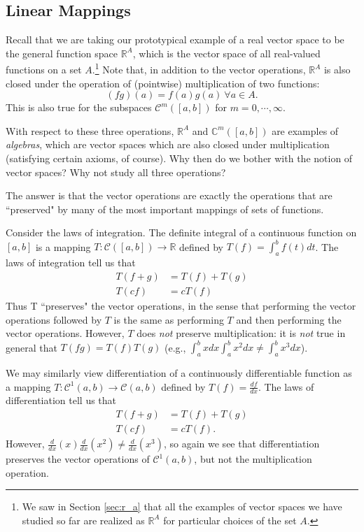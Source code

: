 \documentclass[12pt,letterpaper,reqno]{article}
\numberwithin{equation}{section}
\begin{document}
\subsection{Linear Mappings}
Recall that we are taking our prototypical example of a real vector space to be the general function space $\mathbb{R}^A$, which is the vector space of all real-valued functions on a set $A$.\footnote{We saw in Section \ref{sec:r_a} that all the examples of vector spaces we have studied so far are realized as $\mathbb{R}^A$ for particular choices of the set $A$.} Note that, in addition to the vector operations, $\mathbb{R}^A$ is also closed under the operation of (pointwise) multiplication of two functions: $$(fg)(a)=f(a)g(a) \ \forall a \in A.$$
This is also true for the subspaces $\mathscr{C}^m([a,b])$ for $m=0,\cdots,\infty$. 

With respect to these three operations, $\mathbb{R}^A$ and $\mathbb{C}^m([a,b])$ are examples of \emph{algebras}, which are vector spaces which are also closed under multiplication (satisfying certain axioms, of course). Why then do we bother with the notion of vector spaces? Why not study all three operations?

The answer is that the vector operations are exactly the operations that are ``preserved" by many of the most important mappings of sets of functions. 

\begin{example}
Consider the laws of integration. The definite integral of a continuous function on $[a,b]$ is a mapping $T:\mathscr{C}([a,b]) \to \mathbb{R}$ defined by $T(f)=\int_{a}^bf(t)dt$. The laws of integration tell us that
\begin{align*}
	T(f+g)&=T(f)+T(g) \\
	T(cf)&=cT(f)
\end{align*}
Thus T ``preserves" the vector operations, in the sense that performing the vector operations followed by $T$ is the same as performing $T$ and then performing the vector operations. However, $T$ does \emph{not} preserve multiplication: it is \emph{not} true in general that $T(fg)=T(f)T(g)$ (e.g., $\int_a^b x dx \int_a^b x^2 dx\neq \int_a^b x^3 dx$).
\end{example}

\begin{example}
We may similarly view differentiation of a continuously differentiable function as a mapping $T:\mathscr{C}^1(a,b) \to \mathscr{C}(a,b)$ defined by $T(f)=\frac{df}{dx}$. The laws of differentiation tell us that 
\begin{align*}
	T(f+g)&=T(f)+T(g) \\
	T(cf)&=cT(f).
\end{align*}
However, $\frac{d}{dx}(x)\frac{d}{dx}(x^2) \neq \frac{d}{dx}(x^3)$, so again we see that differentiation preserves the vector operations of $\mathscr{C}^1(a,b)$, but not the multiplication operation.
\end{example}
\end{document}
